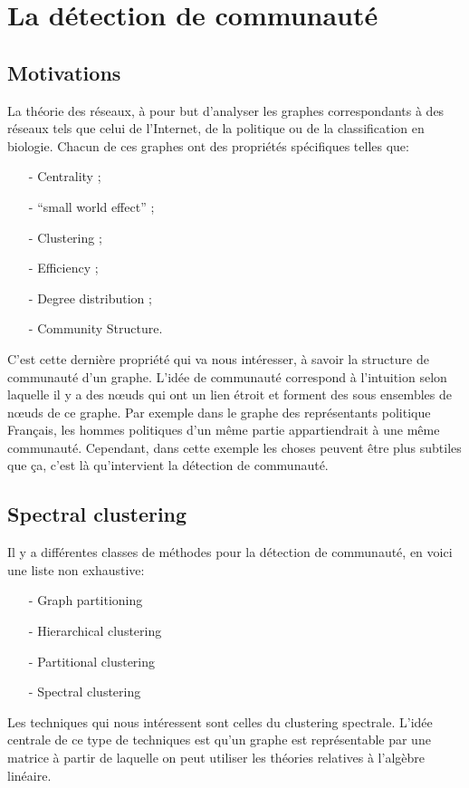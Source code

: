 \section{La détection de communauté}
\subsection{Motivations}
La théorie des réseaux, à pour but d'analyser les graphes correspondants à des réseaux tels que celui de l'Internet, de la politique ou de la classification en biologie.
Chacun de ces graphes ont des propriétés spécifiques telles que:
\begin{itemize}
 	\item[-] Centrality ;
 	\item[-] ``small world effect'' ;
 	\item[-] Clustering ;
 	\item[-] Efficiency ;
 	\item[-] Degree distribution ; 
 	\item[-] Community Structure.\\
 \end{itemize}
 C'est cette dernière propriété qui va nous intéresser, à savoir la structure de communauté d'un graphe.
 L'idée de communauté correspond à l'intuition selon laquelle il y a des nœuds qui ont un lien étroit et forment des sous ensembles de nœuds de ce graphe.
 Par exemple dans le graphe des représentants politique Français, les hommes politiques d'un même partie appartiendrait à une même communauté.
 Cependant, dans cette exemple les choses peuvent être plus subtiles que ça, c'est là qu'intervient la détection de communauté.

\subsection{Spectral clustering}
Il y a différentes classes de méthodes pour la détection de communauté, en voici une liste non exhaustive:
\begin{itemize}
	\item[-] Graph partitioning
	\item[-] Hierarchical clustering
	\item[-] Partitional clustering
	\item[-] Spectral clustering \\
\end{itemize}

Les techniques qui nous intéressent sont celles du clustering spectrale.
L'idée centrale de ce type de techniques est qu'un graphe est représentable par une matrice à partir de laquelle on peut utiliser les théories relatives à l'algèbre linéaire.

